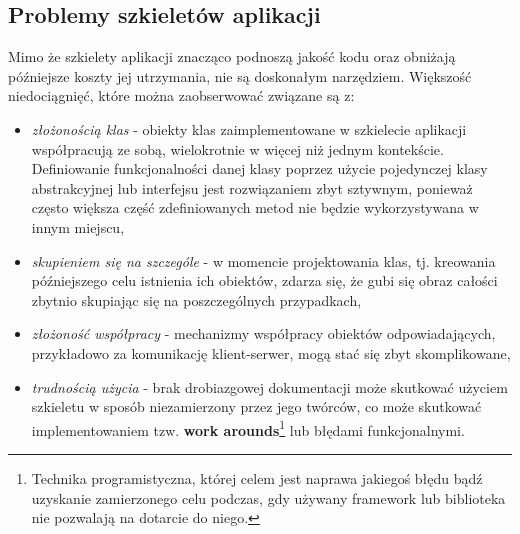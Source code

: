 		\subsection{Problemy szkieletów aplikacji}
			Mimo że szkielety aplikacji znacząco podnoszą jakość kodu oraz obniżają późniejsze koszty jej utrzymania, nie są doskonałym narzędziem. Większość niedociągnięć, które można zaobserwować związane są z:
		\begin{itemize}
			\item \textit{złożonością klas} - obiekty klas zaimplementowane w szkielecie aplikacji współpracują ze sobą, wielokrotnie w więcej niż jednym kontekście. Definiowanie funkcjonalności danej klasy poprzez użycie pojedynczej klasy abstrakcyjnej lub interfejsu jest rozwiązaniem zbyt sztywnym, ponieważ często większa część zdefiniowanych metod nie będzie wykorzystywana w innym miejscu,
			\item \textit{skupieniem się na szczególe} - w momencie projektowania klas, tj. kreowania późniejszego celu istnienia ich obiektów, zdarza się, że gubi się obraz całości zbytnio skupiając się na poszczególnych przypadkach,  \item \textit{złożoność współpracy} - mechanizmy współpracy obiektów odpowiadających, przykładowo za komunikację klient-serwer, mogą stać się zbyt skomplikowane,
			\item \textit{trudnością użycia} - brak drobiazgowej dokumentacji może skutkować użyciem szkieletu w sposób niezamierzony przez jego twórców, co może skutkować implementowaniem tzw. \textbf{work arounds}\footnote{Technika programistyczna, której celem jest naprawa jakiegoś błędu bądź uzyskanie zamierzonego celu podczas, gdy używany framework lub biblioteka nie pozwalają na dotarcie do niego.} lub błędami funkcjonalnymi\cite{framework_design_-_a_role_modeling_approach}. 
		\end{itemize}


